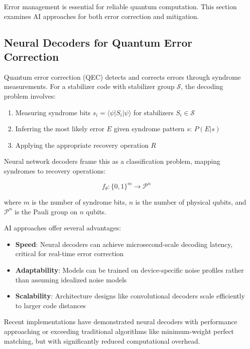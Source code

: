 Error management is essential for reliable quantum computation. This section examines AI approaches for both error correction and mitigation.

\subsection{Neural Decoders for Quantum Error Correction}
Quantum error correction (QEC) detects and corrects errors through syndrome measurements. For a stabilizer code with stabilizer group $\mathcal{S}$, the decoding problem involves:

\begin{enumerate}
    \item Measuring syndrome bits $s_i = \langle \psi | S_i | \psi \rangle$ for stabilizers $S_i \in \mathcal{S}$
    \item Inferring the most likely error $E$ given syndrome pattern $s$: $P(E|s)$
    \item Applying the appropriate recovery operation $R$
\end{enumerate}

Neural network decoders frame this as a classification problem, mapping syndromes to recovery operations:

\begin{equation}
f_\theta: \{0,1\}^m \rightarrow \mathcal{P}^n
\end{equation}

where $m$ is the number of syndrome bits, $n$ is the number of physical qubits, and $\mathcal{P}^n$ is the Pauli group on $n$ qubits.

AI approaches offer several advantages:

\begin{itemize}
    \item \textbf{Speed}: Neural decoders can achieve microsecond-scale decoding latency, critical for real-time error correction
    
    \item \textbf{Adaptability}: Models can be trained on device-specific noise profiles rather than assuming idealized noise models
    
    \item \textbf{Scalability}: Architecture designs like convolutional decoders scale efficiently to larger code distances
\end{itemize}

Recent implementations have demonstrated neural decoders with performance approaching or exceeding traditional algorithms like minimum-weight perfect matching, but with significantly reduced computational overhead.

